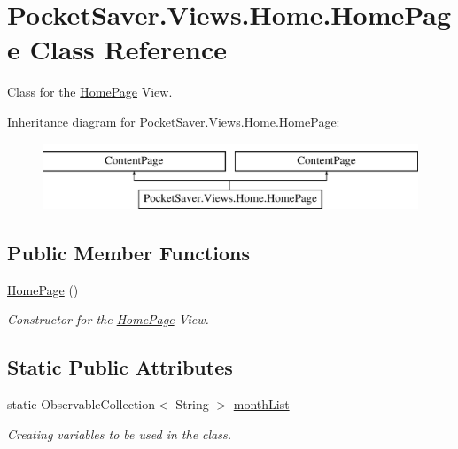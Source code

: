 \hypertarget{class_pocket_saver_1_1_views_1_1_home_1_1_home_page}{}\section{Pocket\+Saver.\+Views.\+Home.\+Home\+Page Class Reference}
\label{class_pocket_saver_1_1_views_1_1_home_1_1_home_page}


Class for the \hyperlink{class_pocket_saver_1_1_views_1_1_home_1_1_home_page}{Home\+Page} View.  


Inheritance diagram for Pocket\+Saver.\+Views.\+Home.\+Home\+Page\+:\begin{figure}[H]
\begin{center}
\leavevmode
\includegraphics[height=2.000000cm]{class_pocket_saver_1_1_views_1_1_home_1_1_home_page}
\end{center}
\end{figure}
\subsection*{Public Member Functions}
\begin{DoxyCompactItemize}
\item 
\hyperlink{class_pocket_saver_1_1_views_1_1_home_1_1_home_page_a816da50c9151c39febfe0f5803a2cdb3}{Home\+Page} ()
\begin{DoxyCompactList}\small\item\em Constructor for the \hyperlink{class_pocket_saver_1_1_views_1_1_home_1_1_home_page}{Home\+Page} View. \end{DoxyCompactList}\end{DoxyCompactItemize}
\subsection*{Static Public Attributes}
\begin{DoxyCompactItemize}
\item 
static Observable\+Collection$<$ String $>$ \hyperlink{class_pocket_saver_1_1_views_1_1_home_1_1_home_page_a3304f2eabf76bd2855aa806363a9616d}{month\+List}
\begin{DoxyCompactList}\small\item\em Creating variables to be used in the class. \end{DoxyCompactList}\end{DoxyCompactItemize}
